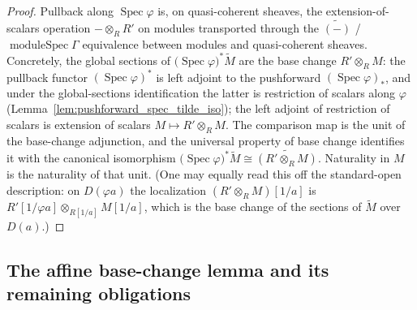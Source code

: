 \begin{proof}
  Pullback along \(\operatorname{Spec}\varphi\) is, on quasi-coherent sheaves, the
  extension-of-scalars operation \(- \otimes_R R'\) on modules transported through
  the \(\widetilde{(-)}\) / \(\operatorname{moduleSpec}\Gamma\) equivalence between
  modules and quasi-coherent sheaves. Concretely, the global sections of
  \(\bigl(\operatorname{Spec}\varphi\bigr)^{*}\widetilde{M}\) are the base change
  \(R' \otimes_R M\): the pullback functor \((\operatorname{Spec}\varphi)^{*}\) is
  left adjoint to the pushforward \((\operatorname{Spec}\varphi)_{*}\), and under
  the global-sections identification the latter is restriction of scalars along
  \(\varphi\) (Lemma~\ref{lem:pushforward_spec_tilde_iso}); the left adjoint of
  restriction of scalars is extension of scalars \(M \mapsto R' \otimes_R M\). The
  comparison map is the unit of the base-change adjunction, and the universal
  property of base change identifies it with the canonical isomorphism
  \(\bigl(\operatorname{Spec}\varphi\bigr)^{*}\widetilde{M} \cong
  \widetilde{(R' \otimes_R M)}\). Naturality in \(M\) is the naturality of that
  unit. (One may equally read this off the standard-open description: on
  \(D(\varphi a)\) the localization \((R' \otimes_R M)[1/a]\) is
  \(R'[1/\varphi a] \otimes_{R[1/a]} M[1/a]\), which is the base change of the
  sections of \(\widetilde M\) over \(D(a)\).)
\end{proof}

\subsection{The affine base-change lemma and its remaining obligations}

